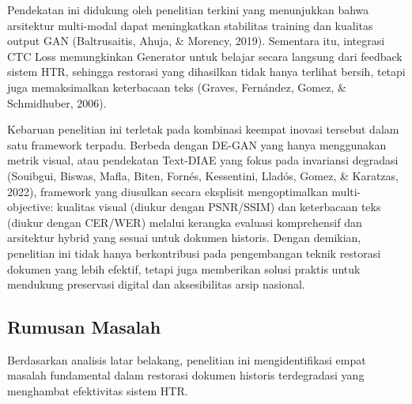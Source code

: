 \documentclass[12pt,a4paper]{article}
\begin{document}
\vspace{0.8em}
Pendekatan ini didukung oleh penelitian terkini yang menunjukkan bahwa arsitektur multi-modal dapat meningkatkan stabilitas training dan kualitas output GAN (Baltrusaitis, Ahuja, \& Morency, 2019). Sementara itu, integrasi CTC Loss memungkinkan Generator untuk belajar secara langsung dari feedback sistem HTR, sehingga restorasi yang dihasilkan tidak hanya terlihat bersih, tetapi juga memaksimalkan keterbacaan teks (Graves, Fernández, Gomez, \& Schmidhuber, 2006).

\vspace{0.8em}
Kebaruan penelitian ini terletak pada kombinasi keempat inovasi tersebut dalam satu framework terpadu. Berbeda dengan DE-GAN yang hanya menggunakan metrik visual, atau pendekatan Text-DIAE yang fokus pada invariansi degradasi (Souibgui, Biswas, Mafla, Biten, Fornés, Kessentini, Lladós, Gomez, \& Karatzas, 2022), framework yang diusulkan secara eksplisit mengoptimalkan multi-objective: kualitas visual (diukur dengan PSNR/SSIM) dan keterbacaan teks (diukur dengan CER/WER) melalui kerangka evaluasi komprehensif dan arsitektur hybrid yang sesuai untuk dokumen historis. Dengan demikian, penelitian ini tidak hanya berkontribusi pada pengembangan teknik restorasi dokumen yang lebih efektif, tetapi juga memberikan solusi praktis untuk mendukung preservasi digital dan aksesibilitas arsip nasional.
\vspace{0.8em}
\subsection{Rumusan Masalah}
\label{subsec:rumusan-masalah}

Berdasarkan analisis latar belakang, penelitian ini mengidentifikasi empat masalah fundamental dalam restorasi dokumen historis terdegradasi yang menghambat efektivitas sistem HTR.
\end{document}
